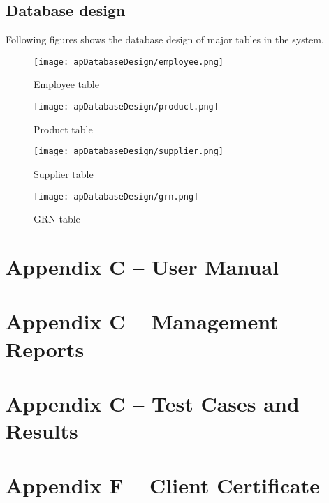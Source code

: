 \documentclass[12pt]{report}
\begin{document}
\section{Database design}
Following figures shows the database design of major tables in the system.

\begin{figure}[H]
	\centering
	\texttt{[image: apDatabaseDesign/employee.png]}
	\caption{Employee table}
\end{figure}

\begin{figure}[H]
	\centering
	\texttt{[image: apDatabaseDesign/product.png]}
	\caption{Product table}
\end{figure}

\begin{figure}[H]
	\centering
	\texttt{[image: apDatabaseDesign/supplier.png]}
	\caption{Supplier table}
\end{figure}

\begin{figure}[H]
	\centering
	\texttt{[image: apDatabaseDesign/grn.png]}
	\caption{GRN table}
\end{figure}

\chapter*{\Huge Appendix C – User Manual}

\chapter*{\Huge Appendix C – Management Reports}

\chapter*{\Huge Appendix C – Test Cases and Results}

\chapter*{\Huge Appendix F – Client Certificate}
\end{document}
